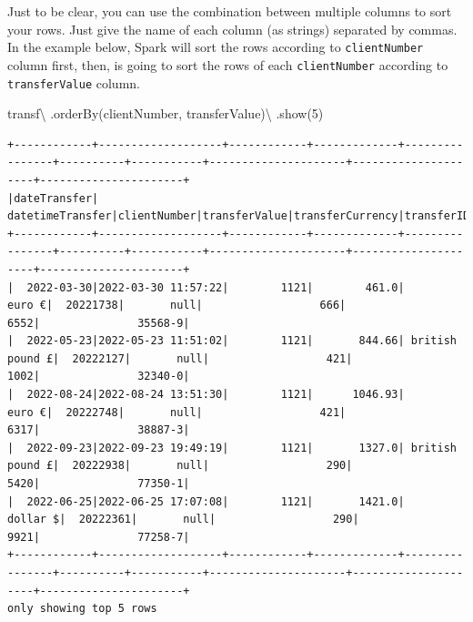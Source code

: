 \documentclass[
  11pt,
  letterpaper,
  DIV=11,
  numbers=noendperiod]{scrreprt}
\newenvironment{Shaded}{\begin{snugshade}}{\end{snugshade}}
\newcommand{\DecValTok}[1]{\textcolor[rgb]{0.68,0.00,0.00}{#1}}
\newcommand{\NormalTok}[1]{\textcolor[rgb]{0.00,0.23,0.31}{#1}}
\newcommand{\OperatorTok}[1]{\textcolor[rgb]{0.37,0.37,0.37}{#1}}
\newcommand{\StringTok}[1]{\textcolor[rgb]{0.13,0.47,0.30}{#1}}
\begin{document}
Just to be clear, you can use the combination between multiple columns
to sort your rows. Just give the name of each column (as strings)
separated by commas. In the example below, Spark will sort the rows
according to \texttt{clientNumber} column first, then, is going to sort
the rows of each \texttt{clientNumber} according to
\texttt{transferValue} column.

\begin{Shaded}
\begin{Highlighting}[]
\NormalTok{transf}\OperatorTok{\textbackslash{}}
\NormalTok{  .orderBy(}\StringTok{\textquotesingle{}clientNumber\textquotesingle{}}\NormalTok{, }\StringTok{\textquotesingle{}transferValue\textquotesingle{}}\NormalTok{)}\OperatorTok{\textbackslash{}}
\NormalTok{  .show(}\DecValTok{5}\NormalTok{)}
\end{Highlighting}
\end{Shaded}

\begin{verbatim}
+------------+-------------------+------------+-------------+----------------+----------+-----------+---------------------+---------------------+----------------------+
|dateTransfer|   datetimeTransfer|clientNumber|transferValue|transferCurrency|transferID|transferLog|destinationBankNumber|destinationBankBranch|destinationBankAccount|
+------------+-------------------+------------+-------------+----------------+----------+-----------+---------------------+---------------------+----------------------+
|  2022-03-30|2022-03-30 11:57:22|        1121|        461.0|          euro €|  20221738|       null|                  666|                 6552|               35568-9|
|  2022-05-23|2022-05-23 11:51:02|        1121|       844.66| british pound £|  20222127|       null|                  421|                 1002|               32340-0|
|  2022-08-24|2022-08-24 13:51:30|        1121|      1046.93|          euro €|  20222748|       null|                  421|                 6317|               38887-3|
|  2022-09-23|2022-09-23 19:49:19|        1121|       1327.0| british pound £|  20222938|       null|                  290|                 5420|               77350-1|
|  2022-06-25|2022-06-25 17:07:08|        1121|       1421.0|        dollar $|  20222361|       null|                  290|                 9921|               77258-7|
+------------+-------------------+------------+-------------+----------------+----------+-----------+---------------------+---------------------+----------------------+
only showing top 5 rows
\end{verbatim}
\end{document}
